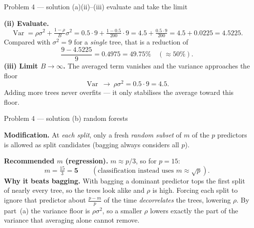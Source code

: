 \documentclass[aspectratio=169,11pt]{beamer}
\begin{document}
\begin{frame}{Problem 4 --- solution (a)(ii)--(iii) evaluate and take the limit}
  \begin{solutionbox}[Solution P4(a) --- numbers for {$B=200$}; {$\rho=0.5$}; {$\sigma^2=9$}]
    \textbf{(ii) Evaluate.}
    \[
      \operatorname{Var}=\rho\sigma^2+\tfrac{1-\rho}{B}\sigma^2
      =0.5\cdot9+\tfrac{1-0.5}{200}\cdot9
      =4.5+\tfrac{0.5\cdot9}{200}=4.5+0.0225=\mathbf{4.5225}.
    \]
    Compared with $\sigma^2=9$ for a \emph{single} tree, that is a reduction of
    \[
      \frac{9-4.5225}{9}=0.4975=\mathbf{49.75\%}\quad(\approx 50\%).
    \]
    \textbf{(iii) Limit $B\to\infty$.} The averaged term vanishes and the variance approaches the
    floor
    \[
      \operatorname{Var}\ \longrightarrow\ \rho\sigma^2=0.5\cdot9=\mathbf{4.5}.
    \]
    Adding more trees never overfits --- it only stabilises the average toward this floor.
  \end{solutionbox}
\end{frame}

\begin{frame}{Problem 4 --- solution (b) random forests}
  \begin{solutionbox}
    \textbf{Modification.} At \emph{each split}, only a fresh \emph{random subset} of $m$ of the
    $p$ predictors is allowed as split candidates (bagging always considers all $p$).
    \medskip

    \textbf{Recommended $m$ (regression).} $m\approx p/3$, so for $p=15$:
    \[
      m=\tfrac{15}{3}=\mathbf{5}\qquad(\text{classification instead uses } m\approx\sqrt p).
    \]
    \textbf{Why it beats bagging.} With bagging a dominant predictor tops the first split of
    nearly every tree, so the trees look alike and $\rho$ is high. Forcing each split to ignore
    that predictor about $\tfrac{p-m}{p}$ of the time \emph{decorrelates} the trees, lowering
    $\rho$. By part~(a) the variance floor is $\rho\sigma^2$, so a smaller $\rho$ lowers exactly
    the part of the variance that averaging alone cannot remove.
  \end{solutionbox}
\end{frame}
\end{document}
